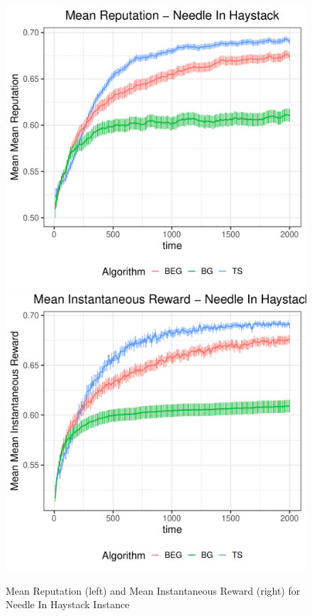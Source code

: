 \documentclass[../competing_bandits_with_appendix.tex]{subfiles}
\begin{document}
\begin{figure}[h]
\begin{center}
\includegraphics[scale=0.35]{ec19paper/figures/nih_mean}
\includegraphics[scale=0.35]{ec19paper/figures/mean_inst_reward_nih}
\caption{Mean Reputation (left) and Mean Instantaneous Reward (right) for Needle In Haystack Instance}
\end{center}
\end{figure}
\end{document}
